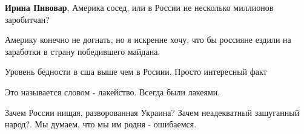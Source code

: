 \begin{itemize}
\begin{itemize}
\textbf{Ирина Пивовар}, Америка сосед, или в России не несколько миллионов заробитчан?
\end{itemize}

 
Америку конечно не догнать, но я искренне хочу, что бы россияне ездили на заработки в страну победившего майдана.

 
Уровень бедности в сша выше чем в Росиии. Просто интересный факт

 
Это называется словом - лакейство. Всегда были лакеями.

 
Зачем России нищая, разворованная Украина? Зачем неадекватный зашуганный народ?. Мы думаем, что мы им родня - ошибаемся.

\end{itemize}

